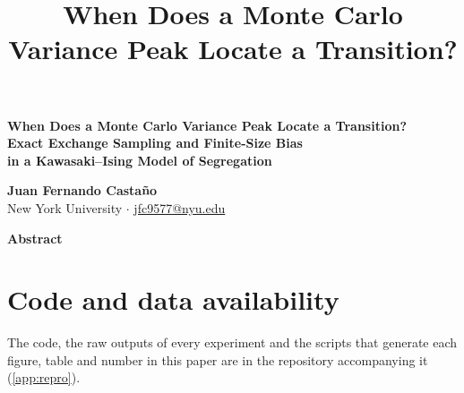 
\title{\textbf{When Does a Monte Carlo Variance Peak Locate a Transition?}}

\begin{center}
{\LARGE\bfseries When Does a Monte Carlo Variance Peak Locate a Transition?\\[4pt]
\Large Exact Exchange Sampling and Finite-Size Bias\\ in a Kawasaki--Ising Model of Segregation\par}
\vspace{1.4em}
{\bfseries\color{linkcol}\large Juan Fernando Casta\~no}\\[0.4em]
{\small New York University \quad $\cdot$ \quad \href{mailto:jfc9577@nyu.edu}{jfc9577@nyu.edu}}\par
\vspace{1.2em}
\end{center}
\begin{center}\textbf{Abstract}\end{center}
\vspace{-0.4em}
\begin{quote}\small\end{quote}
\vspace{0.4em}











\section*{Code and data availability}
The code, the raw outputs of every experiment and the scripts that generate each figure, table and number in this paper are in the repository accompanying it (\cref{app:repro}).





